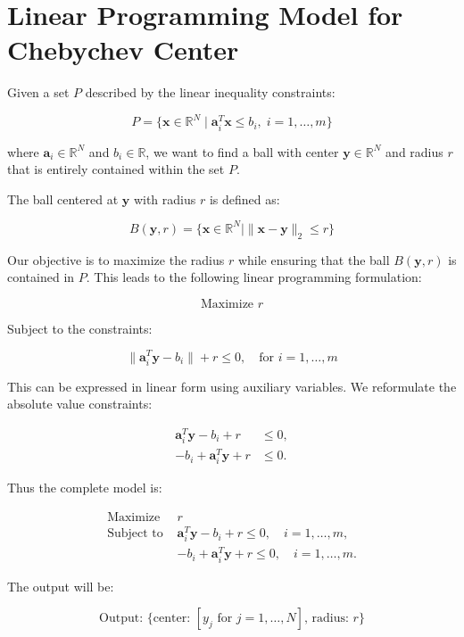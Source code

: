 \documentclass{article}
\begin{document}
\section*{Linear Programming Model for Chebychev Center}

Given a set \( P \) described by the linear inequality constraints:

\[
P = \{ \mathbf{x} \in \mathbb{R}^{N} \mid \mathbf{a}_{i}^{T} \mathbf{x} \leq b_{i}, \; i = 1, \ldots, m \}
\]

where \( \mathbf{a}_{i} \in \mathbb{R}^{N} \) and \( b_{i} \in \mathbb{R} \), we want to find a ball with center \( \mathbf{y} \in \mathbb{R}^{N} \) and radius \( r \) that is entirely contained within the set \( P \).

The ball centered at \( \mathbf{y} \) with radius \( r \) is defined as:

\[
B(\mathbf{y}, r) = \{ \mathbf{x} \in \mathbb{R}^{N} \mid \|\mathbf{x} - \mathbf{y}\|_2 \leq r \}
\]

Our objective is to maximize the radius \( r \) while ensuring that the ball \( B(\mathbf{y}, r) \) is contained in \( P \). This leads to the following linear programming formulation:

\[
\text{Maximize } r
\]

Subject to the constraints:

\[
\|\mathbf{a}_{i}^{T} \mathbf{y} - b_{i}\| + r \leq 0, \quad \text{for } i = 1, \ldots, m
\]

This can be expressed in linear form using auxiliary variables. We reformulate the absolute value constraints:

\[
\begin{aligned}
\mathbf{a}_{i}^{T} \mathbf{y} - b_{i} + r & \leq 0, \\
-b_{i} + \mathbf{a}_{i}^{T} \mathbf{y} + r & \leq 0.
\end{aligned}
\]

Thus the complete model is:

\[
\begin{aligned}
\text{Maximize } & r \\
\text{Subject to } & \mathbf{a}_{i}^{T} \mathbf{y} - b_{i} + r \leq 0, \quad i = 1, \ldots, m, \\
& -b_{i} + \mathbf{a}_{i}^{T} \mathbf{y} + r \leq 0, \quad i = 1, \ldots, m.
\end{aligned}
\]

The output will be:

\[
\text{Output: } \{ \text{center: } [y_{j} \text{ for } j = 1, \ldots, N], \, \text{radius: } r \}
\]
\end{document}
